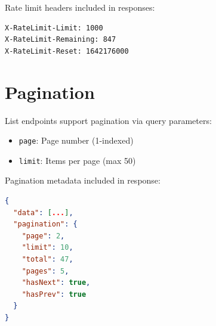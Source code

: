 Rate limit headers included in responses:
\begin{verbatim}
X-RateLimit-Limit: 1000
X-RateLimit-Remaining: 847
X-RateLimit-Reset: 1642176000
\end{verbatim}

\section{Pagination}

List endpoints support pagination via query parameters:

\begin{itemize}
    \item \texttt{page}: Page number (1-indexed)
    \item \texttt{limit}: Items per page (max 50)
\end{itemize}

Pagination metadata included in response:
\begin{lstlisting}[language=JSON]
{
  "data": [...],
  "pagination": {
    "page": 2,
    "limit": 10,
    "total": 47,
    "pages": 5,
    "hasNext": true,
    "hasPrev": true
  }
}
\end{lstlisting}
